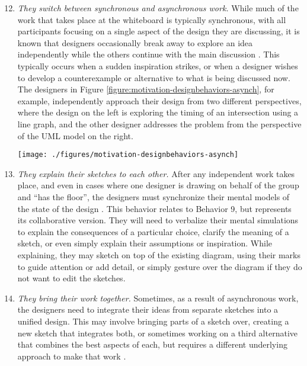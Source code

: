 \begin{enumerate}
  \setcounter{enumi}{11}
  \item \emph{They switch between synchronous and asynchronous work.} While much of the work that takes place at the whiteboard is typically synchronous, with all participants focusing on a single aspect of the design they are discussing, it is known that designers occasionally break away to explore an idea independently while the others continue with the main discussion \cite{dekel2005supporting}. This typically occurs when a sudden inspiration strikes, or when a designer wishes to develop a counterexample or alternative to what is being discussed now. The designers in Figure \ref{figure:motivation-designbehaviors-asynch}, for example, independently approach their design from two different perspectives, where the design on the left is exploring the timing of an intersection using a line graph, and the other designer addresses the problem from the perspective of the UML model on the right.
  
 \begin{figure*}[tbh]
  \centering
  \texttt{[image: ./figures/motivation-designbehaviors-asynch]}
  \caption{Designers sometimes break into independent groups to work out solutions, before later synchronizing their insights.}
  \label{figure:motivation-designbehaviors-asynch}
\end{figure*} 

 \item \emph{They explain their sketches to each other.} After any independent work takes place, and even in cases where one designer is drawing on behalf of the group and ``has the floor'', the designers must synchronize their mental models of the state of the design \cite{dekel2007notation}. This behavior relates to Behavior 9, but represents its collaborative version. They will need to verbalize their mental simulations to explain the consequences of a particular choice, clarify the meaning of a sketch, or even simply explain their assumptions or inspiration. While explaining, they may sketch on top of the existing diagram, using their marks to guide attention or add detail, or simply gesture over the diagram if they do not want to edit the sketches.

 \item \emph{They bring their work together.} Sometimes, as a result of asynchronous work, the designers need to integrate their ideas from separate sketches into a unified design. This may involve bringing parts of a sketch over, creating a new sketch that integrates both, or sometimes working on a third alternative that combines the best aspects of each, but requires a different underlying approach to make that work \cite{dekel2007notation}.
\end{enumerate}

